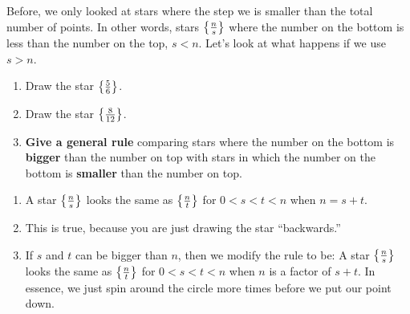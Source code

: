 \documentclass[noauthor,nooutcomes,hints,handout]{ximera}
\begin{document}
\begin{question}
Before, we only looked at stars where the step we is smaller than the total number of points. In other words, stars $\left\{\frac{n}{s}\right\}$ where the number on the bottom is less than the number on the top, $s<n$. Let's look at what happens if we use $s>n$.
\begin{enumerate}
    \item Draw the star $\left\{\frac{5}{6}\right\}$.
\begin{center}
\end{center}
\item Draw the star $\left\{\frac{8}{12}\right\}$.
\begin{center}
\end{center}
  \item \textbf{Give a general rule} comparing stars where the number on the bottom is \textbf{bigger} than the number on top with stars in which the number on the bottom is \textbf{smaller} than the number on top.
  
\end{enumerate}

\end{question}




\begin{freeResponse}
  \begin{enumerate}
  \item A star $\left\{\frac{n}{s}\right\}$ looks the same as $\left\{\frac{n}{t}\right\}$ for
    $0 < s < t< n$ when $n=s+ t$.
  \item This is true, because you are just drawing the star ``backwards.''
  \item If $s$ and $t$ can be bigger than $n$, then we modify the
    rule to be: A star $\left\{\frac{n}{s}\right\}$ looks the same as
    $\left\{\frac{n}{t}\right\}$ for $0 < s < t< n$ when $n$ is a factor of
    $s+t$. In essence, we just spin around the circle more times
    before we put our point down.
  \end{enumerate}
\end{freeResponse}
\end{document}
